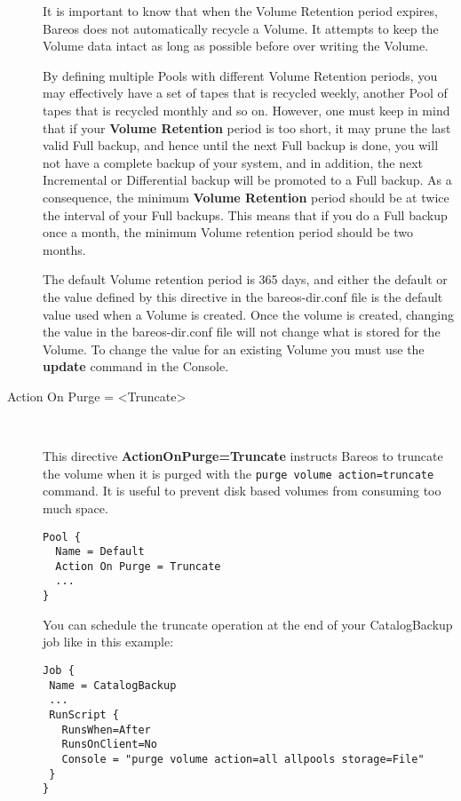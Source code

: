\begin{description}
It is important to know that when the Volume Retention period expires,
Bareos does not automatically recycle a Volume. It attempts to keep the
Volume data intact as long as possible before over writing the Volume.

By defining multiple Pools with different Volume Retention periods, you
may effectively have a set of tapes that is recycled weekly, another
Pool of tapes that is recycled monthly and so on.  However, one must
keep in mind that if your {\bf Volume Retention} period is too short, it
may prune the last valid Full backup, and hence until the next Full
backup is done, you will not have a complete backup of your system, and
in addition, the next Incremental or Differential backup will be
promoted to a Full backup.  As a consequence, the minimum {\bf Volume
Retention} period should be at twice the interval of your Full backups.
This means that if you do a Full backup once a month, the minimum Volume
retention period should be two months.

The default Volume retention period is 365 days, and either the default
or the value defined by this directive in the bareos-dir.conf file is
the default value used when a Volume is created.  Once the volume is
created, changing the value in the bareos-dir.conf file will not change
what is stored for the Volume.  To change the value for an existing
Volume you must use the {\bf update} command in the Console.

\item [Action On Purge = {\textless}Truncate{\textgreater}] \hfill \\

This directive \textbf{ActionOnPurge=Truncate} instructs Bareos to truncate the
volume when it is purged with the \texttt{purge volume action=truncate}
command. It is useful to prevent disk based volumes from consuming too much
space.

\begin{verbatim}
Pool {
  Name = Default
  Action On Purge = Truncate
  ...
}
\end{verbatim}

You can schedule the truncate operation at the end of your CatalogBackup job
like in this example:

\begin{verbatim}
Job {
 Name = CatalogBackup
 ...
 RunScript {
   RunsWhen=After
   RunsOnClient=No
   Console = "purge volume action=all allpools storage=File"
 }
}
\end{verbatim}


\end{description}
